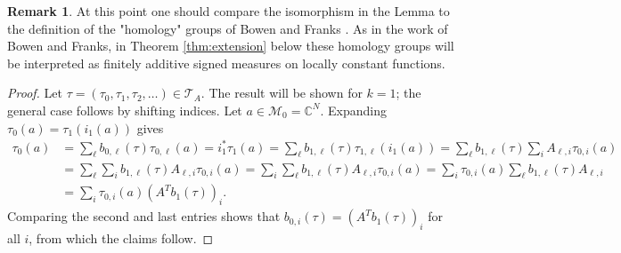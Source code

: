 \documentclass[12pt]{amsart}
\theoremstyle{plain}
\theoremstyle{definition}
\newtheorem{remark}{Remark}[section]
\begin{document}
\begin{remark}
\label{rem:BF}
At this point one should compare the isomorphism in the Lemma to the definition of the "homology" groups of Bowen and Franks \cite[\S 2]{BowenFranks:homology}. As in the work of Bowen and Franks, in Theorem \ref{thm:extension} below these homology groups will be interpreted as finitely additive signed measures on locally constant functions.
\end{remark}
\begin{proof}
    Let $\tau = (\tau_0,\tau_1,\tau_2,\dots)\in \mathcal{T} _A$. The result will be shown for $k=1$; the general case follows by shifting indices. Let $a\in\mathcal{M}_0  = \mathbb{C}^N$. Expanding $\tau_0(a) = \tau_1(i_1(a))$ gives
    \begin{equation*}
        \begin{split}
            \tau_0(a) &=  \sum_{\ell} b_{0,\ell}(\tau) \tau_{0,\ell}(a) = i^*_1\tau_1(a) = \sum_{\ell} b_{1,\ell}(\tau) \tau_{1,\ell}(i_1(a)) = \sum_{\ell} b_{1,\ell}(\tau) \sum_{i}A_{\ell,i} \tau_{0,i}(a) \\
            &= \sum_{\ell} \sum_{i}b_{1,\ell}(\tau) A_{\ell,i} \tau_{0,i}(a)  = \sum_{i} \sum_{\ell}b_{1,\ell}(\tau) A_{\ell,i} \tau_{0,i}(a) = \sum_{i} \tau_{0,i}(a) \sum_{\ell}b_{1,\ell}(\tau) A_{\ell,i} \\
            &  =  \sum_{i} \tau_{0,i}(a) (A^Tb_1(\tau))_i.
        \end{split}
    \end{equation*}
Comparing the second and last entries shows that $b_{0,i}(\tau) = (A^Tb_1(\tau))_i$ for all $i$, from which the claims follow.
\end{proof}
\end{document}
